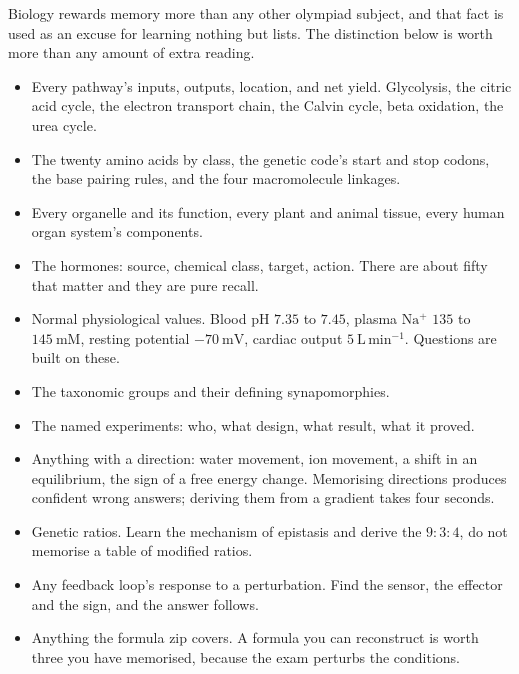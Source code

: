 Biology rewards memory more than any other olympiad subject, and that fact is used as
an excuse for learning nothing but lists. The distinction below is worth more than any
amount of extra reading.

\begin{keybox}[title={Memorise these, cold, with no thinking time}]
\begin{itemize}
\item Every pathway's inputs, outputs, location, and net yield. Glycolysis, the citric
      acid cycle, the electron transport chain, the Calvin cycle, beta oxidation, the
      urea cycle.
\item The twenty amino acids by class, the genetic code's start and stop codons, the
      base pairing rules, and the four macromolecule linkages.
\item Every organelle and its function, every plant and animal tissue, every human
      organ system's components.
\item The hormones: source, chemical class, target, action. There are about fifty that
      matter and they are pure recall.
\item Normal physiological values. Blood pH $7.35$ to $7.45$, plasma $\mathrm{Na^+}$
      $135$ to $145\ \mathrm{mM}$, resting potential $-70\ \mathrm{mV}$, cardiac output
      $5\ \mathrm{L\,min^{-1}}$. Questions are built on these.
\item The taxonomic groups and their defining synapomorphies.
\item The named experiments: who, what design, what result, what it proved.
\end{itemize}
\end{keybox}

\begin{keybox}[title={Work these out, every time, from a principle}]
\begin{itemize}
\item Anything with a direction: water movement, ion movement, a shift in an
      equilibrium, the sign of a free energy change. Memorising directions produces
      confident wrong answers; deriving them from a gradient takes four seconds.
\item Genetic ratios. Learn the mechanism of epistasis and derive the $9{:}3{:}4$, do
      not memorise a table of modified ratios.
\item Any feedback loop's response to a perturbation. Find the sensor, the effector and
      the sign, and the answer follows.
\item Anything the formula zip covers. A formula you can reconstruct is worth three you
      have memorised, because the exam perturbs the conditions.
\end{itemize}
\end{keybox}


